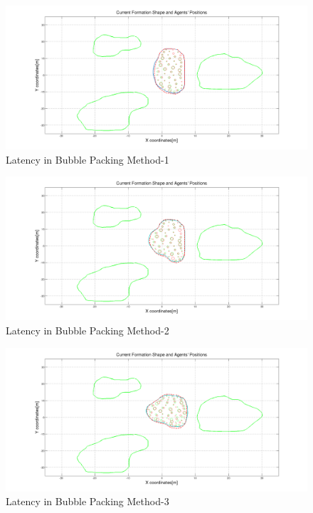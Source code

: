 \begin{figure}[H]
\caption{Latency in Bubble Packing Method-1} \label{combo1_ref}
\centerline{\includegraphics[scale = 0.30]{combo1}}
\end{figure} 

\begin{figure}[H]
\caption{Latency in Bubble Packing Method-2} \label{combo2_ref}
\centerline{\includegraphics[scale = 0.30]{combo2}}
\end{figure} 

\begin{figure}[H]
\caption{Latency in Bubble Packing Method-3} \label{combo3_ref}
\centerline{\includegraphics[scale = 0.30]{combo3}}
\end{figure} 

